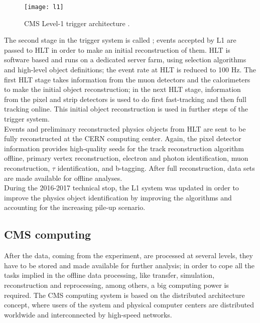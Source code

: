 \begin{figure}[h!]
  \centering
  \texttt{[image: l1]}
  \caption[CMS Level-1 trigger architecture]{CMS Level-1 trigger architecture \cite{l1}. }
  \label{fig:l1}
\end{figure}

\noindent The second stage in the trigger system is called ; events accepted by L1 are passed to HLT in order to make an initial reconstruction of them. HLT is software based and runs on a dedicated server farm, using selection algorithms and high-level object definitions; the event rate at HLT is reduced to 100 Hz. The first HLT stage takes information from the muon detectors and the calorimeters to make the initial object reconstruction; in the next HLT stage, information from the pixel and strip detectors is used to do first fast-tracking and then full tracking online. This initial object reconstruction is used in further steps of the trigger system. \\

\noindent Events and preliminary reconstructed physics objects from HLT are sent to be fully reconstructed at the CERN computing center. Again, the pixel detector information provides high-quality seeds for the track reconstruction algorithm offline, primary vertex reconstruction, electron and photon identification, muon reconstruction, $\tau$ identification, and b-tagging. After full reconstruction, data sets are made available for offline analyses.\\ 

\noindent During the 2016-2017 technical stop, the L1 system was updated in order to improve the physics object identification by improving the algorithms and accounting for the increasing pile-up scenario.  

\subsection{CMS computing}

\noindent After the data, coming from the experiment, are processed at several levels, they have to be stored and made available for further analysis; in order to cope all the tasks implied in the offline data processing, like transfer, simulation, reconstruction and reprocessing, among others, a big computing power is required. The CMS computing system is based on the distributed architecture concept, where users of the system and physical computer centers are distributed worldwide and interconnected by high-speed networks.

